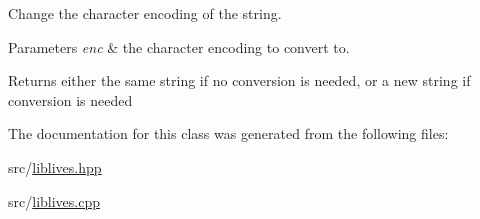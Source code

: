 Change the character encoding of the string. 


\begin{DoxyParams}{Parameters}
{\em enc} & the character encoding to convert to. \\
\hline
\end{DoxyParams}
\begin{DoxyReturn}{Returns}
either the same string if no conversion is needed, or a new string if conversion is needed 
\end{DoxyReturn}


The documentation for this class was generated from the following files\-:\begin{DoxyCompactItemize}
\item 
src/\hyperlink{liblives_8hpp}{liblives.\-hpp}\item 
src/\hyperlink{liblives_8cpp}{liblives.\-cpp}\end{DoxyCompactItemize}
